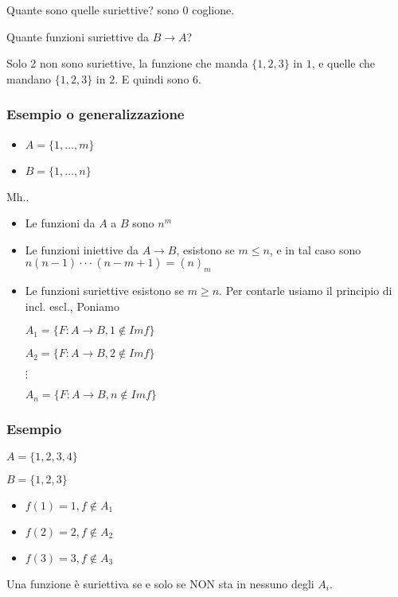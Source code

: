 \documentclass[11pt]{article}
\begin{document}
		Quante sono quelle suriettive? sono 0 coglione.

		Quante funzioni suriettive da $B \to A$?
		
		Solo 2 non sono suriettive, la funzione che manda $\{1,2,3\}$ in $1$,
		e quelle che mandano $\{1,2,3\}$ in $2$. E quindi sono $6$.

		\subsubsection{Esempio o generalizzazione}

		\begin{itemize}
			\item $A = \{1,\ldots,m\}$
			\item $B = \{1,\ldots,n\}$
		\end{itemize}
		
		Mh..

		\begin{itemize}
			\item  Le funzioni da $A$ a $B$ sono $n^{m}$
			\item Le funzioni iniettive da $A \to B$, esistono se $m \leq n$,
				e in tal caso sono $n(n-1)\cdot\cdot\cdot(n-m+1) = (n)_{m}$
			\item Le funzioni suriettive esistono se $m \geq n$.
				Per contarle usiamo il principio di incl. escl.,
				Poniamo 
				
				$A_1 = \{F:A \to  B , 1 \not\in Imf\}$
				
				$A_2 = \{F : A \to  B , 2 \not\in  Imf\}$

				$\vdots$

				$A_n = \{F:A \to  B, n \not\in Imf\}$
		\end{itemize}
		
		\subsubsection{Esempio}
		
		$A = \{1,2,3,4\}$

		$B = \{1,2,3\}$
		
		\begin{itemize}
			\item $f(1) = 1, f \not\in A_1$
			\item $f(2) = 2, f \not\in  A_2$
			\item $f(3) = 3 , f \not\in A_3$
		\end{itemize}
		
		Una funzione \`e suriettiva se e solo se NON sta in nessuno degli $A_i$.
\end{document}

